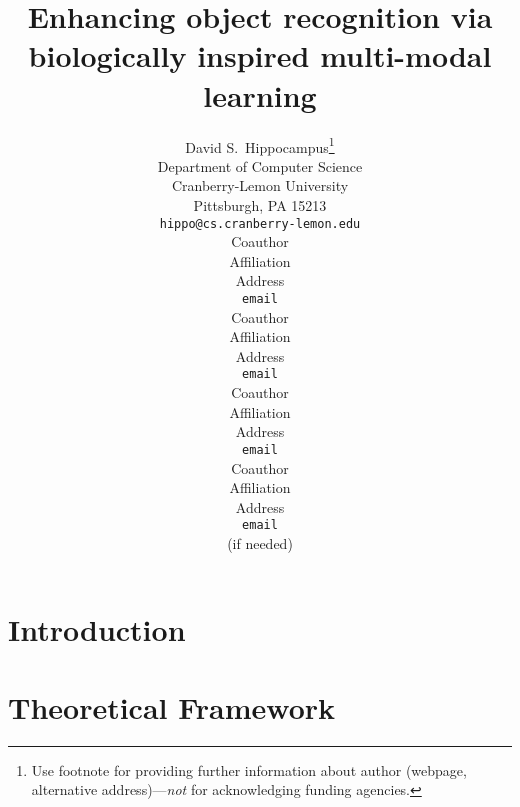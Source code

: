 \documentclass{article}
\title{Enhancing object recognition via\\biologically inspired multi-modal learning}
\author{
David S.~Hippocampus\thanks{ Use footnote for providing further information
about author (webpage, alternative address)---\emph{not} for acknowledging
funding agencies.} \\
Department of Computer Science\\
Cranberry-Lemon University\\
Pittsburgh, PA 15213 \\
\texttt{hippo@cs.cranberry-lemon.edu} \\
\And
Coauthor \\
Affiliation \\
Address \\
\texttt{email} \\
\AND
Coauthor \\
Affiliation \\
Address \\
\texttt{email} \\
\And
Coauthor \\
Affiliation \\
Address \\
\texttt{email} \\
\And
Coauthor \\
Affiliation \\
Address \\
\texttt{email} \\
(if needed)\\
}
\begin{document}

\begin{abstract}

\end{abstract}

\section{Introduction}
\label{sec:intro}




\section{Theoretical Framework}
\label{sec::framework}

\end{document}
